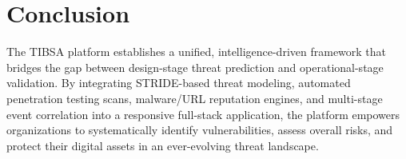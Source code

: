 \section{Conclusion}

The TIBSA platform establishes a unified, intelligence-driven framework that bridges the gap between design-stage threat prediction and operational-stage validation. By integrating STRIDE-based threat modeling, automated penetration testing scans, malware/URL reputation engines, and multi-stage event correlation into a responsive full-stack application, the platform empowers organizations to systematically identify vulnerabilities, assess overall risks, and protect their digital assets in an ever-evolving threat landscape.
